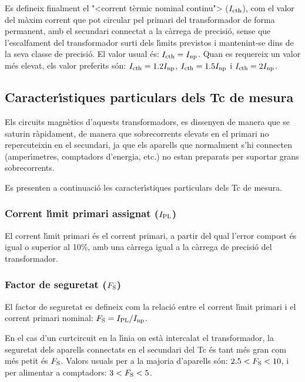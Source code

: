Es defineix finalment el {"<}corrent t\`{e}rmic nominal continu{">} ($I_\mathrm{cth}$), com
el valor del m\`{a}xim corrent que pot circular pel primari del
transformador  de forma permanent, amb el secundari connectat a la
c\`{a}rrega de precisi\'{o}, sense que l'escalfament del transformador surti
dels l\'{\i}mits previstos i mantenint-se dins de la
seva classe de precisi\'{o}. El valor usual \'{e}s: $I_\mathrm{cth} = I_\mathrm{np}$. Quan es requereix un valor m\'{e}s elevat, els valor preferits s\'{o}n:
$I_\mathrm{cth} = \num{1,2}I_\mathrm{np}$, $I_\mathrm{cth} = \num{1,5}I_\mathrm{np}$ i $I_\mathrm{cth} = 2 I_\mathrm{np}$.

\subsection{Caracter\'{\i}stiques particulars dels Tc de mesura}

Els circuits magn\`{e}tics d'aquests transformadors, es dissenyen de
manera que se saturin r\`{a}pidament, de manera que
sobrecorrents elevats en el primari  no repercuteixin en el secundari,
ja que els aparells que normalment s'hi connecten (amper\'{\i}metres,
comptadors d'energia, etc.) no estan preparats per suportar grans
sobrecorrents.

Es presenten a continuaci\'{o} les caracter\'{\i}stiques particulars dels Tc
de mesura.

\subsubsection{Corrent l\'{\i}mit primari  assignat ($I_\mathrm{PL}$)}

El corrent  l\'{\i}mit primari
\'{e}s el corrent primari, a partir del qual l'error compost \'{e}s igual
o superior al 10\unit{\%}, amb una c\`{a}rrega igual a la c\`{a}rrega de
precisi\'{o} del transformador.

\subsubsection{Factor de seguretat ($F_\mathrm{S}$) }

 El factor de seguretat
es defineix com la relaci\'{o} entre el corrent l\'{\i}mit primari
i el corrent primari nominal: $F_\mathrm{S} = I_\mathrm{PL} / I_\mathrm{np}$.

En el cas d'un curtcircuit en la l\'{\i}nia on est\`{a} intercalat el
transformador, la seguretat dels aparells connectats en el secundari
del Tc \'{e}s tant m\'{e}s gran com m\'{e}s petit \'{e}s  $F_\mathrm{S}$. Valors usuals
per a la majoria d'aparells s\'{o}n:  $\num{2,5}<F_\mathrm{S}<10$, i per
alimentar a comptadors: $3<F_\mathrm{S}<5$.

